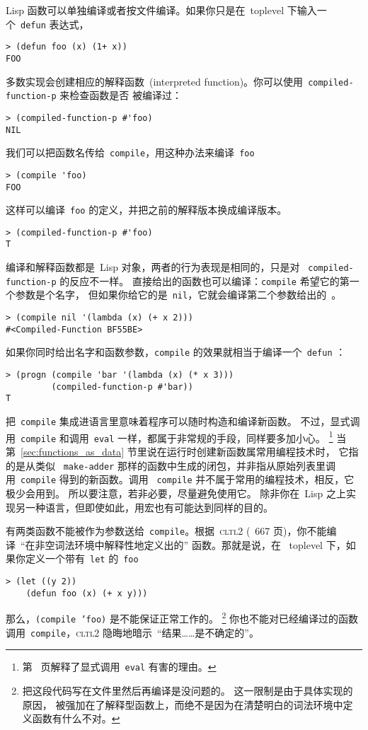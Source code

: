 Lisp 函数可以单独编译或者按文件编译。如果你只是在~toplevel 下输入一个~\texttt{defun}
表达式，
\begin{lstlisting}
> (defun foo (x) (1+ x))
FOO
\end{lstlisting}
多数实现会创建相应的解释函数~(interpreted function)。你可以使用~\texttt{compiled-function-p} 来检查函数是否
被编译过：
\begin{lstlisting}
> (compiled-function-p #'foo)
NIL
\end{lstlisting}
我们可以把函数名传给~\texttt{compile}，用这种办法来编译~\texttt{foo}
\begin{lstlisting}
> (compile 'foo)
FOO
\end{lstlisting}
这样可以编译~\texttt{foo} 的定义，并把之前的解释版本换成编译版本。
\begin{lstlisting}
> (compiled-function-p #'foo)
T
\end{lstlisting}
编译和解释函数都是~Lisp 对象，两者的行为表现是相同的，只是对
~\texttt{compiled-function-p} 的反应不一样。
直接给出的函数也可以编译：\texttt{compile} 希望它的第一个参数是个名字，
但如果你给它的是~\texttt{nil}，它就会编译第二个参数给出的~\lexpr。
\begin{lstlisting}
> (compile nil '(lambda (x) (+ x 2)))
#<Compiled-Function BF55BE>
\end{lstlisting}
\label{page:compiled_function}
如果你同时给出名字和函数参数，\texttt{compile} 的效果就相当于编译一个~\texttt{defun}
：
\begin{lstlisting}
> (progn (compile 'bar '(lambda (x) (* x 3)))
         (compiled-function-p #'bar))
T
\end{lstlisting}
把~\texttt{compile} 集成进语言里意味着程序可以随时构造和编译新函数。
不过，显式调用~\texttt{compile}
和调用~\texttt{eval} 一样，都属于非常规的手段，同样要多加小心。
\footnote{第~\pageref{why-eval-is-bad} 页解释了显式调用~\texttt{eval} 有害的理由。}
当第~\ref{sec:functions_as_data} 节里说在运行时创建新函数属常用编程技术时，
它指的是从类似
~\texttt{make-adder} 那样的函数中生成的闭包，并非指从原始列表里调用~\texttt{compile} 得到的新函数。调用
~\texttt{compile} 并不属于常用的编程技术，相反，它极少会用到。
所以要注意，若非必要，尽量避免使用它。
除非你在~Lisp 之上实现另一种语言，但即使如此，用宏也有可能达到同样的目的。
\label{page:compile}

有两类函数不能被作为参数送给~\texttt{compile}。根据~\textsc{cltl}2
(~667 页)，你不能编译~``在非空词法环境中解释性地定义出的'' 函数。那就是说，在
~toplevel 下，如果你定义一个带有~\texttt{let} 的~\texttt{foo}
\begin{lstlisting}
> (let ((y 2))
    (defun foo (x) (+ x y)))
\end{lstlisting}
那么，\texttt{(compile 'foo)} 是不能保证正常工作的。
\footnote{把这段代码写在文件里然后再编译是没问题的。
  这一限制是由于具体实现的原因，
  被强加在了解释型函数上，而绝不是因为在清楚明白的词法环境中定义函数有什么不对。}
你也不能对已经编译过的函数调用~\texttt{compile}，\textsc{cltl}2
隐晦地暗示~``结果……是不确定的''。

